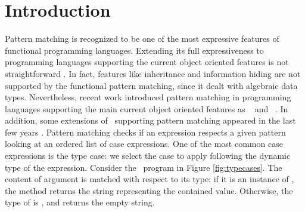 \documentclass{llncs}
\begin{document}
\section{Introduction}
Pattern matching is recognized to be one of the most expressive features of functional programming languages. Extending its full expressiveness to programming languages supporting the current object oriented features is not straightforward \cite{EMI07}. In fact, features like inheritance and information hiding are not supported by the functional pattern matching, since it dealt with algebraic data types. Nevertheless, recent work \cite{EOW07,SNM07} introduced pattern matching in programming languages supporting the main current object oriented features as \FSharp\ \cite{FSharp} and \Scala\ \cite{Scala}. In addition, some extensions of \Java\ supporting pattern matching appeared in the last few years \cite{HNB08,RL07}. Pattern matching checks if an expression respects a given pattern looking at an ordered list of case expressions. One of the most common case expressions is the type case: we select the case to apply following the dynamic type of the expression. Consider the \Scala\ program in Figure \ref{fig:typecases}. The content of argument  is matched with respect to its type: if it is an instance of , the method returns the string representing the contained value. Otherwise, the type of  is , and   returns the empty string.
\end{document}
